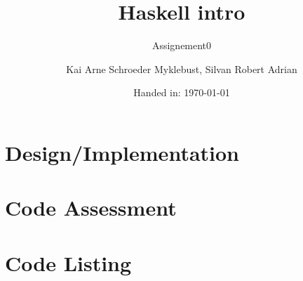 \documentclass[12pt]{article}
\begin{document}
\title{Haskell intro}
\subtitle{Assignement0}

\author{Kai Arne Schroeder Myklebust, Silvan Robert Adrian}
\date{Handed in: \today}
	
\maketitle
\tableofcontents

\section{Design/Implementation}

\section{Code Assessment}

\appendix

\section{Code Listing}

\inputminted{haskell}{src/Arithmetic.hs}
\end{document}
